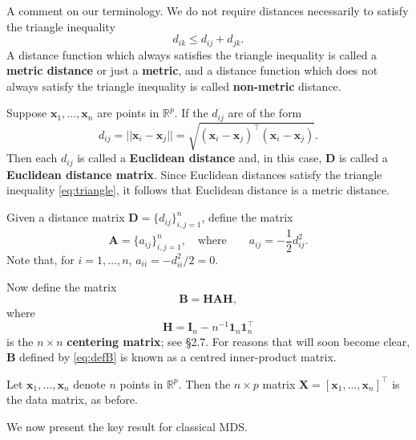 \documentclass[]{book}
\theoremstyle{definition}
\theoremstyle{definition}
\theoremstyle{definition}
\theoremstyle{remark}
\begin{document}
A comment on our terminology. We do not require distances necessarily to satisfy the triangle inequality
\begin{equation}
d_{ik} \leq d_{ij}+d_{jk}.
\label{eq:triangle}
\end{equation}
A distance function which always satisfies the triangle inequality is called a \textbf{metric distance}
or just a \textbf{metric}, and a distance function which does not always satisfy the triangle inequality is called
\textbf{non-metric} distance.

Suppose \(\boldsymbol x_1,\ldots , \boldsymbol x_n\) are points in \(\mathbb{R}^p\). If the \(d_{ij}\) are of the form
\[
d_{ij}=\vert \vert \boldsymbol x_i -\boldsymbol x_j \vert \vert =\sqrt{(\boldsymbol x_i-\boldsymbol x_j)^\top (\boldsymbol x_i-\boldsymbol x_j)}.
\]
Then each \(d_{ij}\) is called a \textbf{Euclidean distance} and, in this case, \(\boldsymbol D\) is called a \textbf{Euclidean distance matrix}. Since Euclidean distances satisfy the triangle
inequality \eqref{eq:triangle}, it follows that Euclidean distance is a metric distance.

Given a distance matrix \({\mathbf D}=\{d_{ij}\}_{i,j=1}^n\), define the matrix
\begin{equation}
\boldsymbol A=\{a_{ij}\}_{i,j=1}^n,  \quad \text{where} \qquad a_{ij}=-\frac{1}{2}d_{ij}^2.
\label{eq:defA}
\end{equation}
Note that, for \(i=1,\ldots , n\), \(a_{ii}=-d_{ii}^2/2=0\).

Now define the matrix
\begin{equation}
{\mathbf B}={\mathbf H} \boldsymbol A{\mathbf H},
\label{eq:defB}
\end{equation}
where
\begin{equation}
{\mathbf H}={\mathbf I}_n -n^{-1}{\mathbf 1}_n {\mathbf 1}_n^\top
\label{eq:defH}
\end{equation}
is the \(n \times n\) \textbf{centering matrix}; see \S 2.7. For reasons that will soon become clear, \(\boldsymbol B\) defined by \eqref{eq:defB} is known as a centred inner-product matrix.

Let \(\boldsymbol x_1, \ldots , \boldsymbol x_n\) denote \(n\) points in \(\mathbb{R}^p\). Then the \(n \times p\) matrix
\(\mathbf X=[\boldsymbol x_1, \ldots , \boldsymbol x_n]^\top\) is the data matrix, as before.

We now present the key result for classical MDS.
\end{document}
